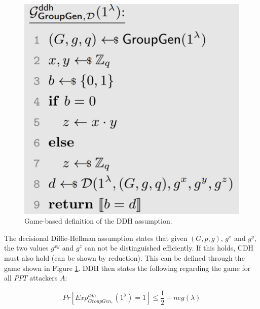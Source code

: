 \begin{figure}
    \center
    \includegraphics[width=\linewidth]{gfx/DDH_assumption.png}
    \caption{Game-based definition of the DDH assumption.}
    \label{fig:DDH_assumption}
\end{figure}

The decisional Diffie-Hellman assumption states that given $(G,p,g)$, $g^x$ and $g^y$, the two values $g^{xy}$ and $g^z$ can not be distinguished efficiently.
If this holds, CDH must also hold (can be shown by reduction).
This can be defined through the game shown in Figure \ref{fig:DDH_assumption}.
DDH then states the following regarding the game for all $PPT$ attackers $A$:

$$
    Pr[Exp_{GroupGen,}^{ddh}(1^\lambda) = 1] \leq \frac{1}{2} + neg(\lambda)
$$

